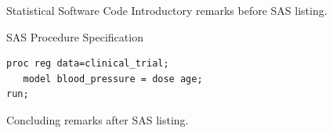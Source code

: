 \documentclass[14pt,t]{beamer-accessibility}
\begin{document}
\begin{frame}[fragile]{Statistical Software Code}
Introductory remarks before SAS listing.

\begin{block}{SAS Procedure Specification}
\begin{lstlisting}[language=SAS,basicstyle=\ttfamily\footnotesize]
proc reg data=clinical_trial;
   model blood_pressure = dose age;
run;
\end{lstlisting}
\end{block}

Concluding remarks after SAS listing.
\end{frame}
\end{document}
